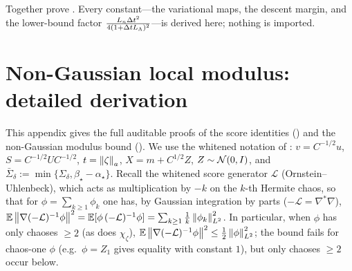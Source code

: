 Together  prove . Every
constant---the variational maps, the descent margin, and the lower-bound factor
$\tfrac{L_n\Delta t^2}{4(1+\Delta tL_\Lambda)^2}$---is derived here; nothing is imported.

\section{Non-Gaussian local modulus: detailed derivation}
\label{app:Kng}

This appendix gives the full auditable proofs of the score identities () and
the non-Gaussian modulus bound (). We use the whitened notation of :
$v=C^{-1/2}u$, $S=C^{-1/2}UC^{-1/2}$, $t=\left\lVert \zeta\right\rVert_a$, $X=m+C^{1/2}Z$, $Z\sim\mathcal{N}(0,I)$, and
$\bar\Sigma_\delta:=\min\{\Sigma_\delta,\beta_\star-\alpha_\star\}$. Recall the whitened score
generator $\mathcal L$ (Ornstein--Uhlenbeck), which acts as multiplication by $-k$ on the $k$-th
Hermite chaos, so that for $\phi=\sum_{k\geq1}\phi_k$ one has, by Gaussian integration by parts
($-\mathcal L=\nabla^*\nabla$),
$\mathbb{E}\left\lVert \nabla(-\mathcal L)^{-1}\phi\right\rVert^2=\mathbb{E}[\phi\,(-\mathcal L)^{-1}\phi]=\sum_{k\geq1}\tfrac1k\left\lVert \phi_k\right\rVert_{L^2}^2$.
In particular, when $\phi$ has only chaoses $\geq2$ (as does $\chi_\zeta$),
$\mathbb{E}\left\lVert \nabla(-\mathcal L)^{-1}\phi\right\rVert^2\leq\tfrac12\left\lVert \phi\right\rVert_{L^2}^2$; the bound fails for chaos-one
$\phi$ (e.g.\ $\phi=Z_1$ gives equality with constant $1$), but only chaoses $\geq2$ occur below.

